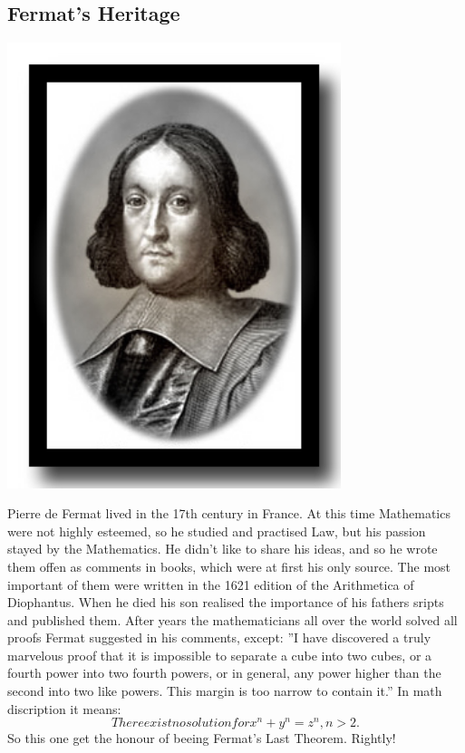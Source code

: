 \documentclass[12pt, a4paper, twoside]{article}
\numberwithin{equation}{section}
\begin{document}
\subsection{Fermat's Heritage}
\begin{center}
\includegraphics[height=13cm]{fermat.jpg}
\newline
\end{center}
Pierre de Fermat lived in the 17th century in France. At this time Mathematics were not highly esteemed, so he studied and practised Law, but his passion stayed by the Mathematics. He didn't like to share his ideas, and so he wrote them offen as comments in books, which were at first his only source. The most important of them were written in the 1621 edition of the Arithmetica of Diophantus. When he died his son realised the importance of his fathers sripts and published them. After years the mathematicians all over the world solved all proofs Fermat suggested in his comments, except: ''I have discovered a truly marvelous proof that it is impossible to separate a cube into two cubes, or a fourth power into two fourth powers, or in general, any power higher than the second into two like powers. This margin is too narrow to contain it.'' In math discription it means:\\
$$There exist no solution for x^n+y^n=z^n, n>2.$$
So this one get the honour of beeing Fermat's Last Theorem. Rightly!
\newpage
\end{document}

